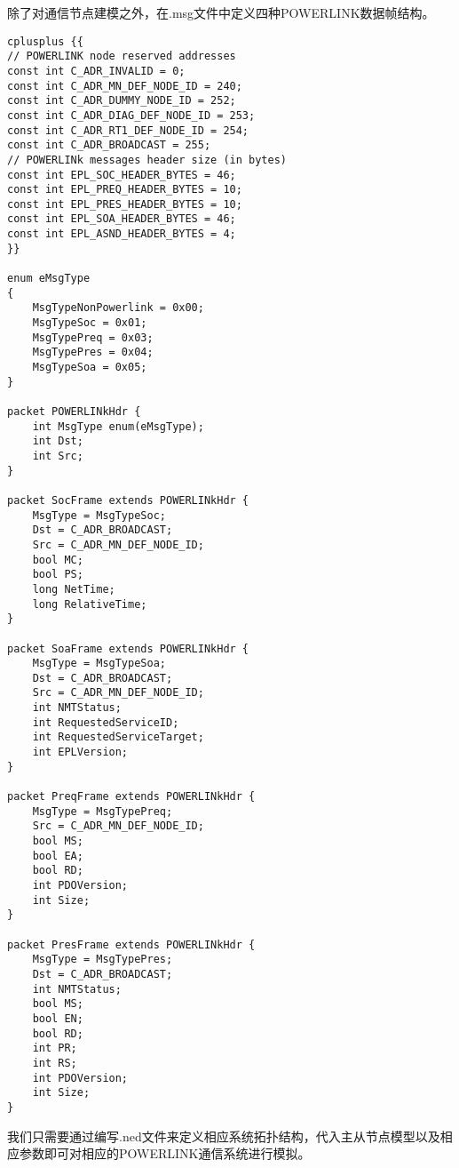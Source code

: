 除了对通信节点建模之外，在.msg文件中定义四种POWERLINK数据帧结构。
\begin{lstlisting}
cplusplus {{
// POWERLINK node reserved addresses
const int C_ADR_INVALID = 0;
const int C_ADR_MN_DEF_NODE_ID = 240;
const int C_ADR_DUMMY_NODE_ID = 252;
const int C_ADR_DIAG_DEF_NODE_ID = 253;
const int C_ADR_RT1_DEF_NODE_ID = 254;
const int C_ADR_BROADCAST = 255;
// POWERLINk messages header size (in bytes)
const int EPL_SOC_HEADER_BYTES = 46;
const int EPL_PREQ_HEADER_BYTES = 10;
const int EPL_PRES_HEADER_BYTES = 10;
const int EPL_SOA_HEADER_BYTES = 46;
const int EPL_ASND_HEADER_BYTES = 4;
}}

enum eMsgType
{
    MsgTypeNonPowerlink = 0x00;
    MsgTypeSoc = 0x01;
    MsgTypePreq = 0x03;
    MsgTypePres = 0x04;
    MsgTypeSoa = 0x05;
}

packet POWERLINkHdr {
    int MsgType enum(eMsgType);
    int Dst;
    int Src;
}

packet SocFrame extends POWERLINkHdr {
    MsgType = MsgTypeSoc;
    Dst = C_ADR_BROADCAST;
    Src = C_ADR_MN_DEF_NODE_ID;
    bool MC;
    bool PS;
    long NetTime;
    long RelativeTime;
}

packet SoaFrame extends POWERLINkHdr {
    MsgType = MsgTypeSoa;
    Dst = C_ADR_BROADCAST;
    Src = C_ADR_MN_DEF_NODE_ID;
    int NMTStatus;
    int RequestedServiceID;
    int RequestedServiceTarget;
    int EPLVersion;
}

packet PreqFrame extends POWERLINkHdr {
    MsgType = MsgTypePreq;
    Src = C_ADR_MN_DEF_NODE_ID;
    bool MS;
    bool EA;
    bool RD;
    int PDOVersion;
    int Size;
}

packet PresFrame extends POWERLINkHdr {
    MsgType = MsgTypePres;
    Dst = C_ADR_BROADCAST;
    int NMTStatus;
    bool MS;
    bool EN;
    bool RD;
    int PR;
    int RS;
    int PDOVersion;
    int Size;
}
\end{lstlisting}

我们只需要通过编写.ned文件来定义相应系统拓扑结构，代入主从节点模型以及相应参数即可对相应的POWERLINK通信系统进行模拟。
